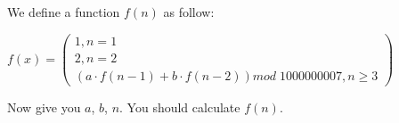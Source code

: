 We define a function $f(n)$ as follow:

$f(x)=\begin{pmatrix}
1,n=1\\
2,n=2\\
(a \cdot f(n-1)+b \cdot f(n-2)) mod\; 1000000007,n \geq 3
\end{pmatrix}$

Now give you $a$, $b$, $n$. You should calculate $f(n)$.
